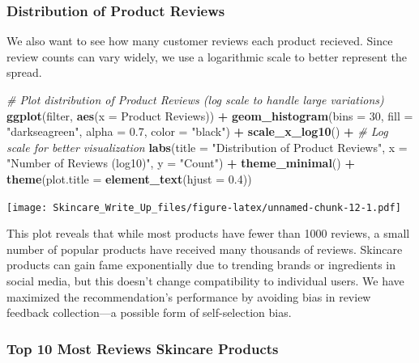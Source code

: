 \documentclass[
]{article}
\newenvironment{Shaded}{\begin{snugshade}}{\end{snugshade}}
\newcommand{\AttributeTok}[1]{\textcolor[rgb]{0.13,0.29,0.53}{#1}}
\newcommand{\CommentTok}[1]{\textcolor[rgb]{0.56,0.35,0.01}{\textit{#1}}}
\newcommand{\DecValTok}[1]{\textcolor[rgb]{0.00,0.00,0.81}{#1}}
\newcommand{\FloatTok}[1]{\textcolor[rgb]{0.00,0.00,0.81}{#1}}
\newcommand{\FunctionTok}[1]{\textcolor[rgb]{0.13,0.29,0.53}{\textbf{#1}}}
\newcommand{\NormalTok}[1]{#1}
\newcommand{\SpecialCharTok}[1]{\textcolor[rgb]{0.81,0.36,0.00}{\textbf{#1}}}
\newcommand{\StringTok}[1]{\textcolor[rgb]{0.31,0.60,0.02}{#1}}
\begin{document}
\subsubsection{Distribution of Product
Reviews}\label{distribution-of-product-reviews}

We also want to see how many customer reviews each product recieved.
Since review counts can vary widely, we use a logarithmic scale to
better represent the spread.

\begin{Shaded}
\begin{Highlighting}[]
\CommentTok{\# Plot distribution of Product Reviews (log scale to handle large variations)}
\FunctionTok{ggplot}\NormalTok{(filter, }\FunctionTok{aes}\NormalTok{(}\AttributeTok{x =} \StringTok{\textasciigrave{}}\AttributeTok{Product Reviews}\StringTok{\textasciigrave{}}\NormalTok{)) }\SpecialCharTok{+}
  \FunctionTok{geom\_histogram}\NormalTok{(}\AttributeTok{bins =} \DecValTok{30}\NormalTok{, }\AttributeTok{fill =} \StringTok{"darkseagreen"}\NormalTok{, }\AttributeTok{alpha =} \FloatTok{0.7}\NormalTok{, }\AttributeTok{color =} \StringTok{"black"}\NormalTok{) }\SpecialCharTok{+}
  \FunctionTok{scale\_x\_log10}\NormalTok{() }\SpecialCharTok{+}  \CommentTok{\# Log scale for better visualization}
  \FunctionTok{labs}\NormalTok{(}\AttributeTok{title =} \StringTok{"Distribution of Product Reviews"}\NormalTok{, }\AttributeTok{x =} \StringTok{"Number of Reviews (log10)"}\NormalTok{, }\AttributeTok{y =} \StringTok{"Count"}\NormalTok{) }\SpecialCharTok{+}
  \FunctionTok{theme\_minimal}\NormalTok{() }\SpecialCharTok{+}
  \FunctionTok{theme}\NormalTok{(}\AttributeTok{plot.title =} \FunctionTok{element\_text}\NormalTok{(}\AttributeTok{hjust =} \FloatTok{0.4}\NormalTok{))}
\end{Highlighting}
\end{Shaded}

\texttt{[image: Skincare\_Write\_Up\_files/figure-latex/unnamed-chunk-12-1.pdf]}

This plot reveals that while most products have fewer than 1000 reviews,
a small number of popular products have received many thousands of
reviews. Skincare products can gain fame exponentially due to trending
brands or ingredients in social media, but this doesn't change
compatibility to individual users. We have maximized the
recommendation's performance by avoiding bias in review feedback
collection---a possible form of self-selection bias.

\subsubsection{Top 10 Most Reviews Skincare
Products}\label{top-10-most-reviews-skincare-products}
\end{document}
